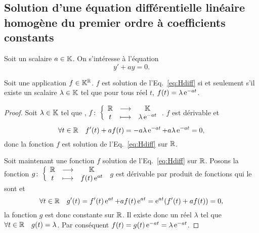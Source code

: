 \subsection[Solution équation homogène coefficients constants]{Solution d'une équation différentielle linéaire homogène du premier ordre à coefficients constants}
\label{subsec:solutioneqdifflinhomog1coefconstants}
Soit un scalaire $a \in \mathbb{K}$. On s'intéresse à l'équation 
\begin{equation}
\label{eq:Hdiff}
y'+ay=0.
\end{equation}
%
\begin{theo}
\label{theo:1}
Soit une application $f \in \mathbb{K}^{\mathbb{R}}$. $f$ est solution de l'Eq.~\eqref{eq:Hdiff} si et seulement s'il existe un scalaire $\lambda \in \mathbb{K}$ tel que pour tous réel $t$, $f(t)=\lambda \operatorname{e}^{-at}$.
\end{theo}
\begin{proof}
Soit $\lambda \in \mathbb{K}$ tel que , $f\colon \left\{\begin{array}{ccc} \mathbb{R} & \longrightarrow &\mathbb{K}\\ t & \longmapsto & \lambda \operatorname{e}^{-at} \end{array} \right.$. $f$ est dérivable et
\begin{equation}
\forall t \in \mathbb{R} \quad f'(t)+af(t)=-a \lambda \operatorname{e}^{-at}+a \lambda \operatorname{e}^{-at}=0,
\end{equation}
donc la fonction $f$ est solution de l'Eq.~\eqref{eq:Hdiff} sur $\mathbb{R}$. 

Soit maintenant une fonction $f$ solution de l'Eq.~\eqref{eq:Hdiff} sur $\mathbb{R}$. Posons la fonction $g\colon \left\{\begin{array}{ccc} \mathbb{R} & \longrightarrow &\mathbb{K}\\ t & \longmapsto & f(t)\operatorname{e}^{at} \end{array} \right.$ $g$ est dérivable par produit de fonctions qui le sont et
\begin{equation}
\forall t \in \mathbb{R} \quad g'(t)=f'(t)\operatorname{e}^{at} + af(t)\operatorname{e}^{at}=\operatorname{e}^{at}(f'(t)+af(t))=0,
\end{equation}
la fonction $g$ est donc constante sur $\mathbb{R}$. Il existe donc un réel $\lambda$ tel que $\forall t \in \mathbb{R} \quad g(t)=\lambda$. Par conséquent $f(t)=g(t)\operatorname{e}^{-at}=\lambda \operatorname{e}^{-at}$.
\end{proof}

